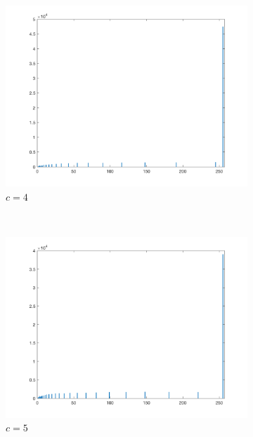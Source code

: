 \documentclass{article}
\begin{document}
\begin{enumerate}[label=(\alph*)]
\begin{figure}[!htb]
        \begin{subfigure}[b]{0.3\textwidth}
            \includegraphics[width=\textwidth]{img/hist_ILT4.png}
            \caption{$c = 4$}
        \end{subfigure}
        ~
        \begin{subfigure}[b]{0.3\textwidth}
            \includegraphics[width=\textwidth]{img/hist_ILT5.png}
            \caption{$c = 5$}
        \end{subfigure}
        ~
        \begin{subfigure}[b]{0.3\textwidth}

\end{subfigure}
\end{figure}
\end{enumerate}
\end{document}
